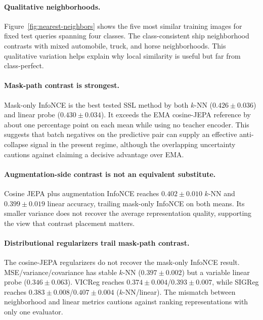 \documentclass[11pt,twocolumn]{article}
\begin{document}
\paragraph{Qualitative neighborhoods.}
Figure~\ref{fig:nearest-neighbors} shows the five most similar training images
for fixed test queries spanning four classes. The class-consistent ship
neighborhood contrasts with mixed automobile, truck, and horse neighborhoods.
This qualitative variation helps explain why local similarity is useful but
far from class-perfect.

\paragraph{Mask-path contrast is strongest.}
Mask-only InfoNCE is the best tested SSL method by both $k$-NN
($0.426\mathbin{\pm}0.036$) and linear probe ($0.430\mathbin{\pm}0.034$).
It exceeds the EMA cosine-JEPA reference by about one percentage point on each
mean while using no teacher encoder. This suggests that batch negatives on the
predictive pair can supply an effective anti-collapse signal in the present
regime, although the overlapping uncertainty cautions against claiming a
decisive advantage over EMA.

\paragraph{Augmentation-side contrast is not an equivalent substitute.}
Cosine JEPA plus augmentation InfoNCE reaches
$0.402\mathbin{\pm}0.010$ $k$-NN and $0.399\mathbin{\pm}0.019$ linear accuracy,
trailing mask-only InfoNCE on both means. Its smaller variance does not recover
the average representation quality, supporting the view that contrast placement matters.

\paragraph{Distributional regularizers trail mask-path contrast.}
The cosine-JEPA regularizers do not recover the mask-only InfoNCE result.
MSE/variance/covariance has stable $k$-NN ($0.397\mathbin{\pm}0.002$) but a
variable linear probe ($0.346\mathbin{\pm}0.063$). VICReg reaches
$0.374\mathbin{\pm}0.004$/$0.393\mathbin{\pm}0.007$, while SIGReg reaches
$0.383\mathbin{\pm}0.008$/$0.407\mathbin{\pm}0.004$ ($k$-NN/linear).
The mismatch between neighborhood and linear metrics cautions against ranking
representations with only one evaluator.
\end{document}
